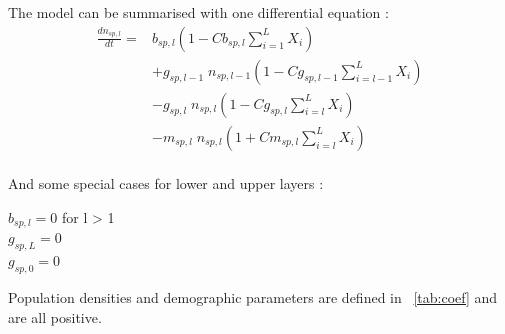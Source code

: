 \documentclass{article}
\begin{document}
\noindent The model can be summarised with one differential equation : \\
\begin{equation}\label{eq:model_general}
    \begin{split}
    \frac{dn_{sp,l}}{dt} = & 
    b_{sp,l} (1 - Cb_{sp,l} \sum_{i = 1}^{L} X_{i}) \\
    & + g_{sp,l - 1} \; n_{sp,l-1} (1 - Cg_{sp,l-1} \sum_{i = l-1}^{L} X_{i}) \\
    & - g_{sp,l} \; n_{sp,l} (1 - Cg_{sp,l} \sum_{i = l}^{L} X_{i}) \\
    & - m_{sp,l} \; n_{sp,l}(1 + Cm_{sp,l} \sum_{i = l}^{L} X_{i})
    \end{split}
\end{equation}
\\
And some special cases for lower and upper layers : \\
\begin{center}
    $b_{sp,l} = 0$ for l > 1 \\
    $g_{sp,L} = 0$ \\
    $g_{sp,0} = 0$
\end{center}

Population densities and demographic parameters are defined in ~\ref{tab:coef} and are all positive.
\end{document}
